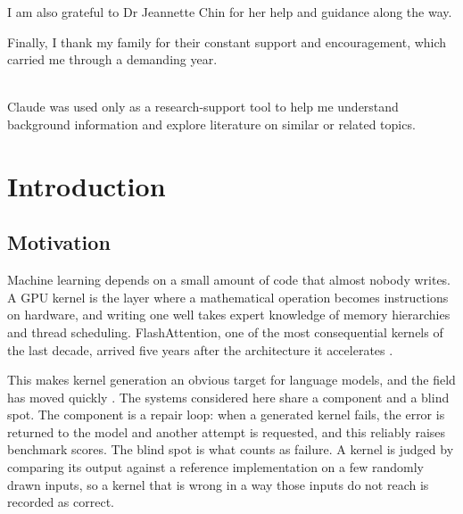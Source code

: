 \documentclass[12pt]{article}
\begin{document}
I am also grateful to Dr Jeannette Chin for her help and guidance along the
way.

Finally, I thank my family for their constant support and encouragement, which
carried me through a demanding year.

\newpage
\vspace{5cm}

\\
Claude was used only as a research-support tool to help me understand background information and explore literature on similar or related topics.

\newpage

\tableofcontents

\newpage

\section{Introduction}

\subsection{Motivation}

Machine learning depends on a small amount of code that almost nobody writes. A
GPU kernel is the layer where a mathematical operation becomes instructions on
hardware, and writing one well takes expert knowledge of memory hierarchies and
thread scheduling. FlashAttention, one of the most consequential kernels of the
last decade, arrived five years after the architecture it accelerates
\citep{dao2022flashattention, ouyang2025kernelbench}.

This makes kernel generation an obvious target for language models, and the
field has moved quickly \citep{li2026cudal1, dai2026cudaagent}. The systems
considered here share a component and a blind spot. The component is a repair
loop: when a generated kernel fails, the error is returned to the model and
another attempt is requested, and this reliably raises benchmark scores. The
blind spot is what counts as failure. A kernel is judged by comparing its
output against a reference implementation on a few randomly drawn inputs, so a
kernel that is wrong in a way those inputs do not reach is recorded as correct.
\end{document}
